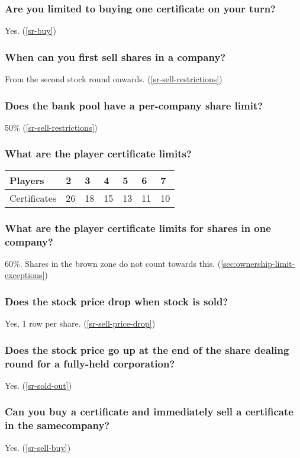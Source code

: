 \subsubsection{Are you limited to buying one certificate on your turn?}
Yes. (\autoref{sr-buy})

\subsubsection{When can you first sell shares in a company?}
From the second stock round onwards. (\autoref{sr-sell-restrictions})

\subsubsection{Does the bank pool have a per-company share limit?}
50\% (\autoref{sr-sell-restrictions})

\subsubsection{What are the player certificate limits?}
\begin{tabular}{l|llllll}
Players & 2 & 3 & 4 & 5 & 6 & 7\\
\hline
Certificates & 26 & 18 & 15 & 13 & 11 & 10 \\
\end{tabular}

\subsubsection{What are the player certificate limits for shares in one company?}
60\%. Shares in the brown zone do not count towards this. (\autoref{sec:ownership-limit-exceptions})

\subsubsection{Does the stock price drop when stock is sold?}
Yes, 1 row per share. (\autoref{sr-sell-price-drop})

\subsubsection{Does the stock price go up at the end of the share dealing round for a fully-held corporation?}
Yes. (\autoref{sr-sold-out})

\subsubsection{Can you buy a certificate and immediately sell a certificate in the samecompany?}
Yes. (\autoref{sr-sell-buy})

